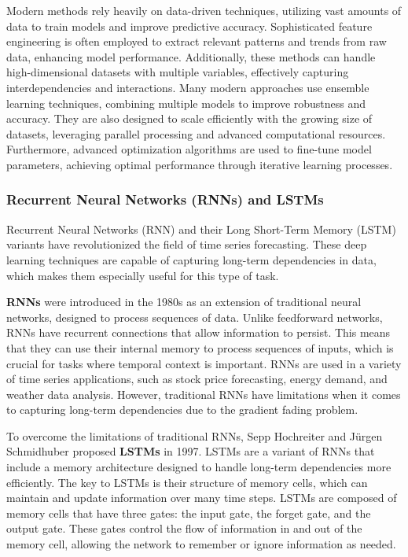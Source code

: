 Modern methods rely heavily on data-driven techniques, utilizing vast amounts of data to train models and improve predictive accuracy. Sophisticated feature engineering is often employed to extract relevant patterns and trends from raw data, enhancing model performance. Additionally, these methods can handle high-dimensional datasets with multiple variables, effectively capturing interdependencies and interactions. Many modern approaches use ensemble learning techniques, combining multiple models to improve robustness and accuracy. They are also designed to scale efficiently with the growing size of datasets, leveraging parallel processing and advanced computational resources. Furthermore, advanced optimization algorithms are used to fine-tune model parameters, achieving optimal performance through iterative learning processes.
\vspace{10pt}


\subsubsection{Recurrent Neural Networks (RNNs) and LSTMs}
Recurrent Neural Networks (RNN) and their Long Short-Term Memory (LSTM) variants have revolutionized the field of time series forecasting. These deep learning techniques are capable of capturing long-term dependencies in data, which makes them especially useful for this type of task.
\vspace{10pt}

\textbf{RNNs} were introduced in the 1980s as an extension of traditional neural networks, designed to process sequences of data. Unlike feedforward networks, RNNs have recurrent connections that allow information to persist. This means that they can use their internal memory to process sequences of inputs, which is crucial for tasks where temporal context is important.
RNNs are used in a variety of time series applications, such as stock price forecasting, energy demand, and weather data analysis. However, traditional RNNs have limitations when it comes to capturing long-term dependencies due to the gradient fading problem.
\vspace{10pt}

To overcome the limitations of traditional RNNs, Sepp Hochreiter and Jürgen Schmidhuber proposed \textbf{LSTMs} in 1997\cite{LSTM}. LSTMs are a variant of RNNs that include a memory architecture designed to handle long-term dependencies more efficiently. The key to LSTMs is their structure of memory cells, which can maintain and update information over many time steps. LSTMs are composed of memory cells that have three gates: the input gate, the forget gate, and the output gate. These gates control the flow of information in and out of the memory cell, allowing the network to remember or ignore information as needed.

